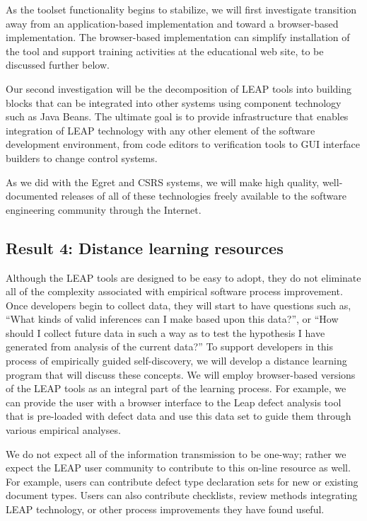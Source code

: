 As the toolset functionality begins to stabilize, we will first investigate
transition away from an application-based implementation and toward
a browser-based implementation.  The browser-based implementation
can simplify installation of the tool and support training
activities at the educational web site, to be discussed further below.

Our second investigation will be the decomposition of LEAP tools into
building blocks that can be integrated into other systems using component
technology such as Java Beans. The ultimate goal is to provide
infrastructure that enables integration of LEAP technology with any other
element of the software development environment, from code editors to
verification tools to GUI interface builders to change control systems.

As we did with the Egret and CSRS systems, we will make high quality,
well-documented releases of all of these technologies freely available to
the software engineering community through the Internet.

\subsection*{Result 4: Distance learning resources}

Although the LEAP tools are designed to be easy to adopt, they do not
eliminate all of the complexity associated with empirical software process
improvement.  Once developers begin to collect data, they will start to
have questions such as, ``What kinds of valid inferences can I make based
upon this data?'', or ``How should I collect future data in such a way as
to test the hypothesis I have generated from analysis of the current
data?''  To support developers in this process of empirically guided
self-discovery, we will develop a distance learning program that
will discuss these concepts.  We will employ browser-based versions
of the LEAP tools as an integral part of the learning process. For
example, we can provide the user with a browser interface to the
Leap defect analysis tool that is pre-loaded with defect data and 
use this data set to guide them through various empirical analyses.

We do not expect all of the information transmission to be one-way; rather we
expect the LEAP user community to contribute to this on-line resource
as well. For example, users can contribute defect type declaration
sets for new or existing document types. Users can also contribute
checklists, review methods integrating LEAP technology, or other 
process improvements they have found useful. 

